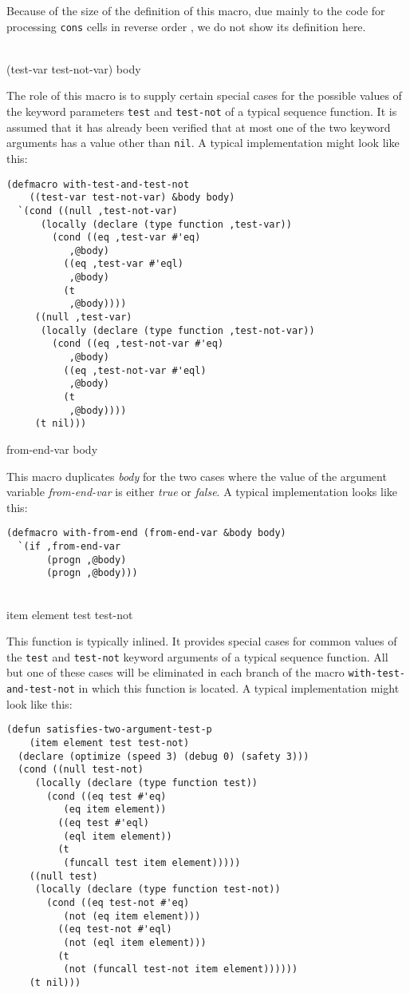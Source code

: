 Because of the size of the definition of this macro, due mainly to the
code for processing \texttt{cons} cells in reverse order
\cite{Durand:2015:ELS:reverse}, we do not show its definition here.

\\
{(test-var test-not-var) \body body}

The role of this macro is to supply certain special cases for the
possible values of the keyword parameters \texttt{test} and
\texttt{test-not} of a typical sequence function.  It is assumed that
it has already been verified that at most one of the two keyword
arguments has a value other than \texttt{nil}.  A typical
implementation might look like this:

{\small\begin{verbatim}
(defmacro with-test-and-test-not
    ((test-var test-not-var) &body body)
  `(cond ((null ,test-not-var)
	  (locally (declare (type function ,test-var))
	    (cond ((eq ,test-var #'eq)
		   ,@body)
		  ((eq ,test-var #'eql)
		   ,@body)
		  (t
		   ,@body))))
	 ((null ,test-var)
	  (locally (declare (type function ,test-not-var))
	    (cond ((eq ,test-not-var #'eq)
		   ,@body)
		  ((eq ,test-not-var #'eql)
		   ,@body)
		  (t
		   ,@body))))
	 (t nil)))
\end{verbatim}}

 {from-end-var \body body}

This macro duplicates \textit{body} for the two cases where the value
of the argument variable \textit{from-end-var} is either \emph{true}
or \emph{false}.  A typical implementation looks like this:

{\small\begin{verbatim}
(defmacro with-from-end (from-end-var &body body)
  `(if ,from-end-var
       (progn ,@body)
       (progn ,@body)))
\end{verbatim}}

\\
{item element test test-not}

This function is typically inlined.  It provides special cases for
common values of the \texttt{test} and \texttt{test-not} keyword
arguments of a typical sequence function.  All but one of these cases
will be eliminated in each branch of the macro
\texttt{with-test-and-test-not} in which this function is located.  A
typical implementation might look like this:

{\small\begin{verbatim}
(defun satisfies-two-argument-test-p
    (item element test test-not)
  (declare (optimize (speed 3) (debug 0) (safety 3)))
  (cond ((null test-not)
	 (locally (declare (type function test))
	   (cond ((eq test #'eq)
		  (eq item element))
		 ((eq test #'eql)
		  (eql item element))
		 (t
		  (funcall test item element)))))
	((null test)
	 (locally (declare (type function test-not))
	   (cond ((eq test-not #'eq)
		  (not (eq item element)))
		 ((eq test-not #'eql)
		  (not (eql item element)))
		 (t
		  (not (funcall test-not item element))))))
	(t nil)))
\end{verbatim}}
